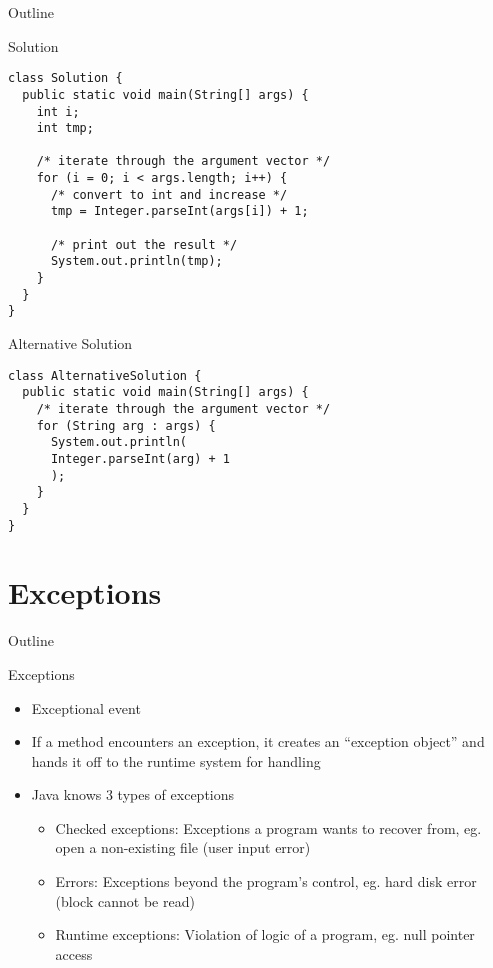 \begin{frame}{Outline}
  \tableofcontents[current]
\end{frame}

\begin{frame}[fragile]{Solution}
  \begin{lstlisting}
class Solution {
  public static void main(String[] args) {
    int i;
    int tmp;
    
    /* iterate through the argument vector */
    for (i = 0; i < args.length; i++) {
      /* convert to int and increase */
      tmp = Integer.parseInt(args[i]) + 1;
      
      /* print out the result */
      System.out.println(tmp); 
    }
  }	
}
  \end{lstlisting}
\end{frame}

\begin{frame}[fragile]{Alternative Solution}
  \begin{lstlisting}
class AlternativeSolution {
  public static void main(String[] args) {
    /* iterate through the argument vector */
    for (String arg : args) {		
      System.out.println(
      Integer.parseInt(arg) + 1
      );
    }
  } 		
}
  \end{lstlisting}
\end{frame}


\section{Exceptions}

\begin{frame}{Outline}
  \tableofcontents[current]
\end{frame}

\begin{frame}{Exceptions}
  \begin{itemize}
  \item Exceptional event
  \item If a method encounters an exception, it creates an ``exception
    object'' and hands it off to the runtime system for handling
  \item Java knows 3 types of exceptions
    \begin{itemize}
    \item Checked exceptions: Exceptions a program wants to recover
      from, eg. open a non-existing file (user input error)
    \item Errors: Exceptions beyond the program's control, eg. hard
      disk error (block cannot be read)
    \item Runtime exceptions: Violation of logic of a program,
      eg. null pointer access
    \end{itemize}
  \end{itemize}
\end{frame}

